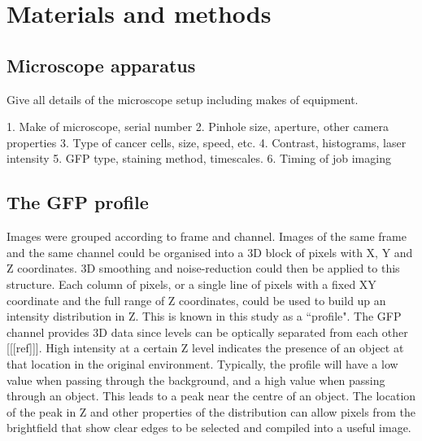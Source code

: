\documentclass[preprint,11pt,5p,twocolumn]{elsarticle}
\begin{document}
\section{Materials and methods}
\label{S:method}

\subsection{Microscope apparatus}
Give all details of the microscope setup including makes of equipment.

1. Make of microscope, serial number
2. Pinhole size, aperture, other camera properties
3. Type of cancer cells, size, speed, etc.
4. Contrast, histograms, laser intensity
5. GFP type, staining method, timescales.
6. Timing of job imaging

\subsection{The GFP profile}
\label{S:method.gfpprofile}

Images were grouped according to frame and channel. Images of the same frame and the same channel could be organised into a 3D block of pixels with X, Y and Z coordinates. 3D smoothing and noise-reduction could then be applied to this structure. Each column of pixels, or a single line of pixels with a fixed XY coordinate and the full range of Z coordinates, could be used to build up an intensity distribution in Z. This is known in this study as a ``profile". The GFP channel provides 3D data since levels can be optically separated from each other [[[ref]]]. High intensity at a certain Z level indicates the presence of an object at that location in the original environment. Typically, the profile will have a low value when passing through the background, and a high value when passing through an object. This leads to a peak near the centre of an object. The location of the peak in Z and other properties of the distribution can allow pixels from the brightfield that show clear edges to be selected and compiled into a useful image.
\end{document}
